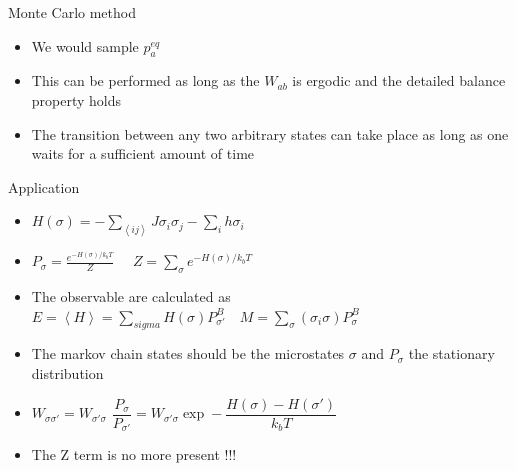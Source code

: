 \documentclass{beamer}
\begin{document}
\begin{frame}{Monte Carlo method \cite{peliti2011statistical}}

\begin{itemize}

\item We would sample $p^{eq}_{a}$ 

\item This can be performed as long as the $W_{ab}$ is ergodic and the detailed balance property holds 

\item The transition between any two arbitrary states can take place as long as one waits for a sufficient amount of time

\end{itemize}

\end{frame}

\begin{frame}{Application \cite{peliti2011statistical}}

\begin{itemize}
\item $H(\sigma)=-\sum_{\left\langle ij \right\rangle}J\sigma_{i}\sigma_{j}-\sum_{i}h\sigma_{i}$
\item $P_{\sigma}=\frac{e^{-H(\sigma)/k_{b}T}}{Z}$  $\quad Z=\sum_{\sigma}e^{-H(\sigma)/k_{b}T}$
\item The observable are calculated as $E=\left\langle H \right\rangle=\sum_{sigma}H(\sigma)P_{\sigma'}^{B} \quad M=\sum_{\sigma}\left(\sigma_{i} \sigma\right)P_{\sigma}^{B}  $
\item The markov chain states should be the microstates $\sigma$ and $P_{\sigma}$ the stationary distribution 
\item $W_{\sigma\sigma '} = W_{\sigma ' \sigma}$ $\dfrac{P_{\sigma}}{P_{\sigma '}}=W_{\sigma ' \sigma} \exp - \dfrac{H(\sigma)-H(\sigma ')}{k_{b}T}$
\item The Z term is no more present !!!
\end{itemize}

\end{frame}
\end{document}
